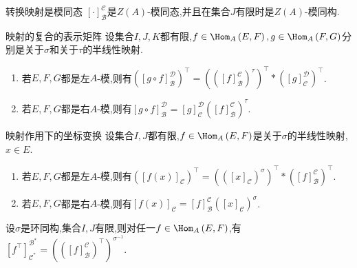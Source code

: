 \begin{proposition}{转换映射是模同态}{}
	$\left[\cdot\right]_{\mathcal{B}}^{\mathcal{C}}$是$Z\left(A\right)$-模同态,并且在集合$J$有限时是$Z\left(A\right)$-模同构.
\end{proposition}

\begin{proposition}{映射的复合的表示矩阵}{}
	设集合$I,J,K$都有限,$f\in\Hom_{A}\left(E,F\right),g\in\Hom_{A}\left(F,G\right)$分别是关于$\sigma$和关于$\tau$的半线性映射.
	\begin{enumerate}
		\item 若$E,F,G$都是左$A$-模,则有$\left(\left[g\circ f\right]_{\mathcal{B}}^{\mathcal{D}}\right)^{\top}=\left(\left(\left[f\right]_{\mathcal{B}}^{\mathcal{C}}\right)^{\tau}\right)^{\top}\ast\left(\left[g\right]_{\mathcal{C}}^{\mathcal{D}}\right)^{\top}$.
		\item 若$E,F,G$都是右$A$-模,则有$\left[g\circ f\right]_{\mathcal{B}}^{\mathcal{D}}=\left[g\right]_{\mathcal{C}}^{\mathcal{D}}\left(\left[f\right]_{\mathcal{B}}^{\mathcal{C}}\right)^{\tau}$.
	\end{enumerate}
\end{proposition}

\begin{corollary}{映射作用下的坐标变换}{}
	设集合$I,J$都有限,$f\in\Hom_{A}\left(E,F\right)$是关于$\sigma$的半线性映射,$x\in E$.
	\begin{enumerate}
		\item 若$E,F,G$都是左$A$-模,则有$\left(\left[f\left(x\right)\right]_{\mathcal{C}}\right)^{\top}=\left(\left(\left[x\right]_{\mathcal{C}}\right)^{\sigma}\right)^{\top}\ast\left(\left[f\right]_{\mathcal{B}}^{\mathcal{C}}\right)^{\top}$.
		\item 若$E,F,G$都是右$A$-模,则有$\left[f\left(x\right)\right]_{\mathcal{C}}=\left[f\right]_{\mathcal{B}}^{\mathcal{C}}\left(\left[x\right]_{\mathcal{C}}\right)^{\sigma}$.
	\end{enumerate}
\end{corollary}

\begin{proposition}{}{}
	设$\sigma$是环同构,集合$I,J$有限,则对任一$f\in\Hom_{A}\left(E,F\right)$,有$\left[f^{\top}\right]_{\mathcal{C^{\ast}}}^{\mathcal{B}^{\ast}}=\left(\left(\left[f\right]_{\mathcal{B}}^{\mathcal{C}}\right)^{\top}\right)^{\sigma^{-1}}$.
\end{proposition}

